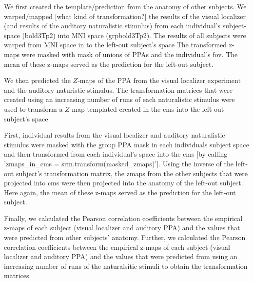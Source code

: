 {%
We first created the template/prediction from the anatomy of other subjects.
%
We warped/mapped [what kind of transformation?] the results of the visual
localizer (and results of the auditory naturalistic stimulus) from each
individual's subject-space (bold3Tp2) into MNI space (grpbold3Tp2).
The results of all subjects were warped from MNI space in to the left-out
subject's space
The transformed z-maps were masked with mask of unions of PPAs and the
individual's \ac{fov}.
%
The mean of these z-maps served as the prediction for the left-out subject.

We then predicted the $Z$-maps of the PPA from the visual localizer experiment
and the auditory naturistic stimulus.
%
The transformation matrices that were created using an increasing number of runs
of each naturalistic stimulus were used to transform a $Z$-map templated created
in the \ac{cms} into the left-out subject's space

First, individual results from the visual localizer and auditory naturalistic
stimulus were masked with the group PPA mask in each individuals subject space
and then transformed from each individual's space into the \ac{cms} [by calling
'zmaps\_in\_cms = srm.transform(masked\_zmaps)'].
Using the inverse of the left-out subject's transformation matrix, the zmaps
from the other subjects that were projected into \ac{cms} were then projected
into the anatomy of the left-out subject.
%
Here again, the mean of these z-maps served as the prediction for the left-out
subject.


Finally, we calculated the Pearson correlation coefficients between the
empirical z-maps of each subject (visual localizer and auditory PPA) and the
values that were predicted from other subjects' anatomy.
%
Further, we calculated the Pearson correlation coefficients between the
empirical z-maps of each subject (visual localizer and auditory PPA) and the
values that were predicted from using an increasing number of runs of the
naturalsitic stimuli to obtain the transformation matrices.


}
